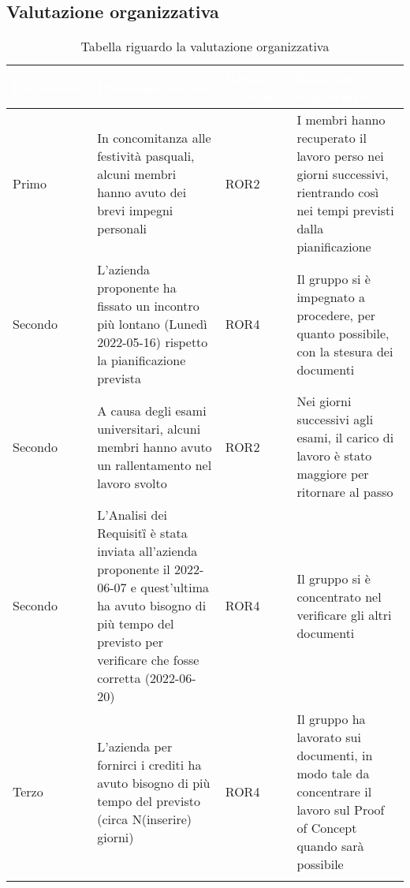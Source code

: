\subsection{Valutazione organizzativa}
{
    \setlength{\freewidth}{\dimexpr\textwidth-10\tabcolsep}
    \renewcommand{\arraystretch}{1.5}
    \centering
    \setlength{\aboverulesep}{0pt}
    \setlength{\belowrulesep}{0pt}
    \begin{longtable}{C{.16\freewidth} C{.38\freewidth} C{.14\freewidth} C{.38\freewidth}}
       \toprule
    \textcolor{white}{\textbf{Incremento}}&
    \textcolor{white}{\textbf{Problema emerso}}&
    \textcolor{white}{\textbf{Rischio associato}}&
    \textcolor{white}{\textbf{Soluzione migliorativa}}\\	
    \toprule
    \endhead
    
   Primo & In concomitanza alle festività pasquali, alcuni membri hanno avuto dei brevi impegni personali & 
          ROR2 &I membri hanno recuperato il lavoro perso nei giorni successivi, rientrando così nei tempi previsti dalla pianificazione \\
   Secondo & L'azienda proponente ha fissato un incontro più lontano (Lunedì 2022-05-16) rispetto la pianificazione prevista &
            ROR4 & Il gruppo si è impegnato a procedere, per quanto possibile, con la stesura dei documenti \\
   Secondo & A causa degli esami universitari, alcuni membri hanno avuto un rallentamento nel lavoro svolto & 
           ROR2 & Nei giorni successivi agli esami, il carico di lavoro è stato maggiore per ritornare al passo \\
   Secondo & L'Analisi dei Requisiti\G{} è stata inviata all'azienda proponente il 2022-06-07 e quest'ultima ha avuto bisogno di più tempo del previsto per verificare che fosse corretta (2022-06-20) & ROR4 &
            Il gruppo si è concentrato nel verificare gli altri documenti \\
   Terzo & L'azienda per fornirci i crediti ha avuto bisogno di più tempo del previsto (circa N(inserire) giorni) & ROR4 & Il gruppo ha lavorato sui documenti, in modo tale da concentrare il lavoro sul Proof of Concept quando sarà possibile \\
   \bottomrule
   \caption{Tabella riguardo la valutazione organizzativa}
   \end{longtable}
}

\newpage
